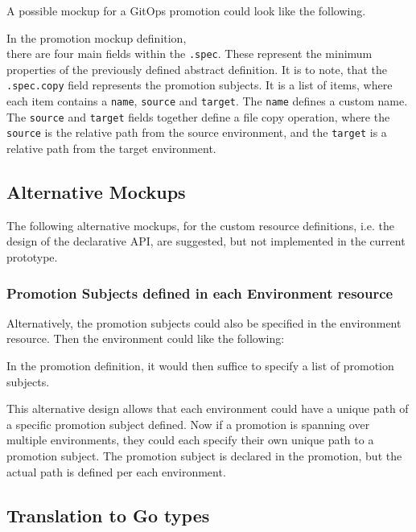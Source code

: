 A possible mockup for a GitOps promotion 
could look like the following.



In the promotion mockup definition,\\
there are four main fields within the \lstinline|.spec|.
These represent the minimum properties of the previously defined abstract definition.
It is to note, that
the \lstinline|.spec.copy| field represents the promotion subjects.
It is a list of items, where each item contains
a \lstinline|name|, \lstinline|source| and \lstinline|target|.
The \lstinline|name| defines a custom name.
The \lstinline|source| and \lstinline|target| fields together define a
file copy operation,
where the \lstinline|source| is the relative path from the source environment,
and the \lstinline|target| is a relative path from the target environment.

\subsection{Alternative Mockups}

The following alternative mockups,
for the custom resource definitions,
i.e. the design of the declarative API,
are suggested, but not implemented in the current prototype.

\subsubsection*{Promotion Subjects defined in each Environment resource}

Alternatively, the promotion subjects could also be specified
in the environment resource.
Then the environment could like the following:



In the promotion definition,
it would then suffice to specify
a list of promotion subjects.



This alternative design allows that each environment could have
a unique path of a specific promotion subject defined.
Now if a promotion is spanning over multiple environments,
they could each specify their own unique path to a promotion subject.
The promotion subject is declared in the promotion,
but the actual path is defined per each environment.

\subsection{Translation to Go types}

